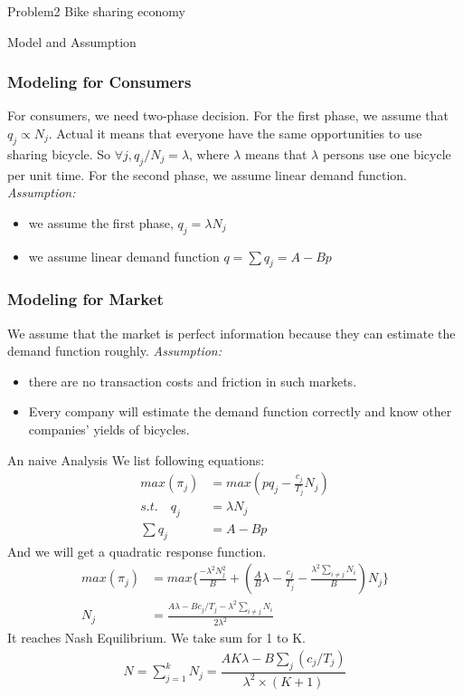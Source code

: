 \documentclass[letterpaper,12pt]{article}
\begin{document}
\begin{section}{Problem2 Bike sharing economy}
\begin{subsection}{Model and Assumption}
	 	\subsubsection{Modeling for Consumers}
	 		For consumers, we need two-phase decision. For the first phase, we assume that $q_j \propto N_j$. Actual it means that everyone have the same opportunities to use sharing bicycle. So $\forall j,q_j/N_j=\lambda$, where $\lambda$ means that $\lambda$ persons use one bicycle per unit time. For the second phase, we assume linear demand function.\\
	 		\emph{Assumption:}
	 			\begin{itemize}
	 				\item we assume the first phase, $q_j = \lambda N_j$
	 				\item we assume linear demand function $q=\sum\limits q_j=A-Bp$
	 			\end{itemize}  
	 	\subsubsection{Modeling for Market}
	 		We assume that the market is perfect information because they can estimate the demand function roughly.
	 		\emph{Assumption:}
	 			\begin{itemize}
	 				\item there are no transaction costs and friction in such markets.
	 				\item Every company will estimate the demand function correctly and know other companies' yields of bicycles.
	 			\end{itemize}
	 \end{subsection}

	 \begin{subsection}{An naive Analysis}
	 	We list following equations:
	 	\begin{align}
	 		max(\pi_j) &= max(pq_j-\frac{c_j}{T_j}N_j)   \\ 
	 		s.t. \quad q_j   &= \lambda N_j\\
	 			\sum\limits q_j &=A - Bp
	 	\end{align}
	 	And we will get a quadratic response function.
	 	\begin{align}
	 		max(\pi_j)&=max\{\frac{-\lambda^2 N_j^2}{B}+(\frac{A}{B}\lambda -\frac{c_j}{T_j}-\frac{\lambda^2 \sum\limits_{i\not=j}N_i }{B})N_j\} \\
	 		N_j &= \frac{A \lambda-B c_j/T_j-\lambda^2 \sum\limits_{i\not=j}N_i}{2\lambda^2}
	 	\end{align}
	 	It reaches Nash Equilibrium. We take sum for 1 to K.
	 	\begin{align}
	 		N = \sum\limits^k_{j=1} N_j = \dfrac{AK \lambda-B\sum_j (c_j/T_j)}{\lambda^2\times(K+1)}
	 	\end{align}
	 \end{subsection}


\end{section}
\end{document}
